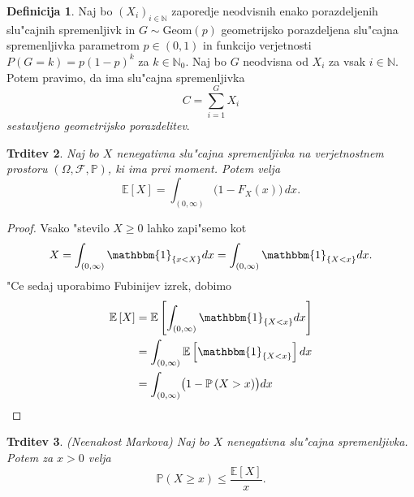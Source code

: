 \documentclass[12pt, a4paper, reqno]{amsart}
\theoremstyle{definition}
\newtheorem{definicija}{Definicija}[section]
\theoremstyle{plain}
\newtheorem{trditev}[definicija]{Trditev}
\newcommand{\N}{\mathbb{N}}
\newcommand{\E}{\mathbb{E}}
\newcommand{\Prob}{\mathbb{P}}
\newcommand{\1}{\mathds{1}}
\begin{document}
    \begin{definicija}
        Naj bo $(X_i)_{i\in\N}$ zaporedje neodvisnih enako porazdeljenih slu"cajnih spremenljivk in 
        $G \sim \text{Geom}(p)$ geometrijsko porazdeljena slu"cajna spremenljivka  parametrom $p\in(0, 1)$ in 
        funkcijo verjetnosti $P(G = k) = p(1 - p)^{k}$ za $k\in\N_0$.
        Naj bo $G$ neodvisna od $X_i$ za vsak $i\in\N$. Potem pravimo, da ima slu"cajna spremenljivka
        \begin{equation*}
            C = \sum_{i= 1}^{G} X_i
        \end{equation*}
        \textit{sestavljeno geometrijsko porazdelitev}.
        \label{def:CompoundGeometricDistribution}
    \end{definicija}

    \begin{trditev}
        Naj bo $X$ nenegativna slu"cajna spremenljivka na verjetnostnem prostoru $(\Omega, \mathcal{F}, \Prob)$, 
        ki ima prvi moment. Potem velja 
        \begin{equation*}
            \E\left[X\right] = \int_{(0, \infty)}\bigl(1 - F_X(x)\bigr)\,dx.
        \end{equation*}
        \label{trd:PricakovanaVrednostZPrezivetveno}
    \end{trditev}

    \begin{proof}
        Vsako "stevilo $X\geq 0$ lahko zapi"semo kot 
        \begin{equation*}
            X = \int_{(0, \infty)}\mathbbm{1}_{\{x < X\}}dx = \int_{(0, \infty)}\mathbbm{1}_{\{X < x\}}dx.
        \end{equation*}
        "Ce sedaj uporabimo Fubinijev izrek, dobimo
        \begin{align*}
            \E\left[X\right] &= \E\left[\int_{(0, \infty)}\mathbbm{1}_{\{X < x\}}dx\right] \\
                             &= \int_{(0, \infty)}\E\left[\mathbbm{1}_{\{X < x\}}\right]dx \\
                             &= \int_{(0, \infty)}\bigl(1 - \Prob\left(X > x\right)\bigr)dx \\
        \end{align*}
    \end{proof}

    \begin{trditev}(Neenakost Markova)
        \label{trd:neenakostMarkova}
        Naj bo $X$ nenegativna slu"cajna spremenljivka.
        Potem za  $x>0$ velja
        \begin{equation*}
            \Prob\left(X \geq x\right) \leq \frac{\E\left[X\right]}{x}.
        \end{equation*}
    \end{trditev}
\end{document}
